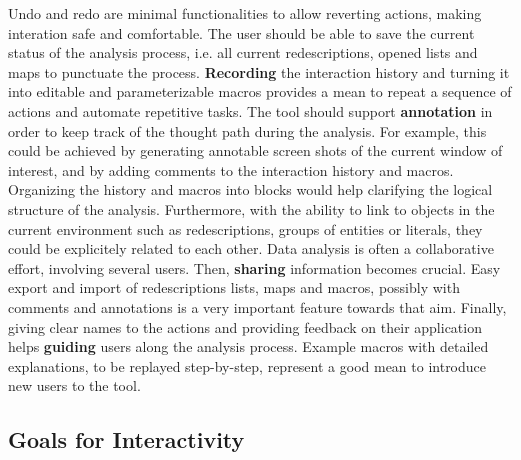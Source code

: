 Undo and redo are minimal functionalities to allow reverting actions,
making interation safe and comfortable.  The user should be able to
save the current status of the analysis process, i.e. all current
redescriptions, opened lists and maps to punctuate the
process. \textbf{Recording} the interaction history and turning it
into editable and parameterizable macros provides a mean to repeat a
sequence of actions and automate repetitive tasks.  The tool should
support \textbf{annotation} in order to keep track of the thought path
during the analysis.  For example, this could be achieved by
generating annotable screen shots of the current window of interest,
and by adding comments to the interaction history and macros.
Organizing the history and macros into blocks would help clarifying
the logical structure of the analysis.  Furthermore, with the ability
to link to objects in the current environment such as redescriptions,
groups of entities or literals, they could be explicitely related to
each other.  Data analysis is often a collaborative effort, involving
several users. Then, \textbf{sharing} information becomes crucial.
Easy export and import of redescriptions lists, maps and macros,
possibly with comments and annotations is a very important feature
towards that aim.  Finally, giving clear names to the actions and
providing feedback on their application helps \textbf{guiding} users
along the analysis process. Example macros with detailed explanations,
to be replayed step-by-step, represent a good mean to introduce new
users to the tool.

\subsection{Goals for Interactivity}
\label{sec:goals-interaction}


